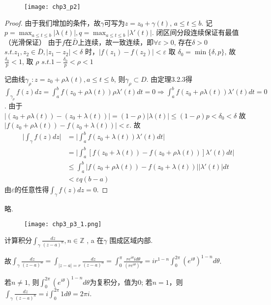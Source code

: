 \begin{figure}[h]
	\centering
	\texttt{[image: chp3\_p2]}
\end{figure}

\begin{proof}
	由于我们增加的条件，故$\gamma$可写为$z = z_0 + \gamma(t)$, $a \leq t \leq b$.
	记$p = \max_{a \leq t \leq b} \vert \lambda (t) \vert, q = \max_{a \leq t \leq b} \vert \lambda'(t) \vert$. 闭区间分段连续保证有最值（光滑保证）
	由于$f$在$\bar{D}$上连续，故一致连续，即$\forall \varepsilon > 0$, 存在$\delta > 0$ $s.t. z_1, z_2 \in \bar{D}, \vert z_1 - z_2 \vert < \delta$ 时，$\vert f(z_1) - f(z_2) \vert < \varepsilon$
	取 $\delta_0 = \min \{ \delta, p \}$, 故$\frac{\delta_0}{p} <1 $, 取 $\rho$ $ s.t. 1 - \frac{\delta_0}{p} < \rho < 1$
	
	记曲线$\gamma_\rho: z = z_0 + \rho \lambda(t), a \leq t \leq b$, 则$\gamma_\rho \subset D$. 由定理3.2.3得 $\int_{\gamma_\rho} f(z)dz = \int_a^b f(z_0 + \rho \lambda(t)) \rho \lambda'(t) dt = 0 \Rightarrow \int_a^b f(z_0 + \rho \lambda(t)) \lambda'(t) dt = 0$.
	由于$\vert (z_0 + \rho \lambda(t)) - (z_0 + \lambda(t)) \vert = (1 - \rho) \vert \lambda(t) \vert \leq (1-\rho) p < \delta_0 < \delta$
	故$\vert f(z_0 + \rho \lambda(t)) - f(z_0 + \lambda(t)) \vert < \varepsilon$.
	故
	\begin{align*}
	\vert \int_\gamma f(z) dz \vert &= \vert \int_a ^b f(z_0 + \lambda(t)) \lambda'(t) dt \vert \\
	&= \vert \int_a^b [f(z_0 + \lambda(t)) - f(z_0 + \rho \lambda(t))] \lambda'(t) dt \vert\\
	&\leq \int_a^b \vert f(z_0 + \rho \lambda(t)) - f(z_0 + \lambda(t)) \vert \vert \lambda'(t) \vert dt\\
	&< \varepsilon q(b-a)
	\end{align*}
	由$\varepsilon$的任意性得$\int_\gamma f(z) dz = 0$.
	
\end{proof}




\begin{mypro}  略.
\end{mypro}

\begin{figure}[h]
	\centering
	\texttt{[image: chp3\_p3\_1.png]}
\end{figure}
\begin{eg}
	计算积分$\int_\gamma \frac{dz}{(z - a)^n}, n \in \mathbb{Z}$ , a 在$\gamma$ 围成区域内部.
\end{eg}
\begin{jie}
	
	故$\int_\gamma \frac{dz}{(z-a)^n} = \int_{|z-a| = r} \frac{dz}{(z-a) ^n}  = \int_0 ^ \pi \frac{r e ^{i \theta} i d \theta}{(re^{i \theta})^n} = i r^{1-n} \int_0^{2\pi} (e^{i\theta})^{1-n} d \theta$.
	
	若$n \neq 1$, 则$\int_0 ^{2\pi} (e^{i \theta})^{1-n} d\theta$为复积分，值为0;
	若$n=1$，则$\int_\gamma \frac{dz}{(z - a)^n} = i \int_0 ^{2\pi} 1 d\theta = 2\pi i$.
\end{jie}


